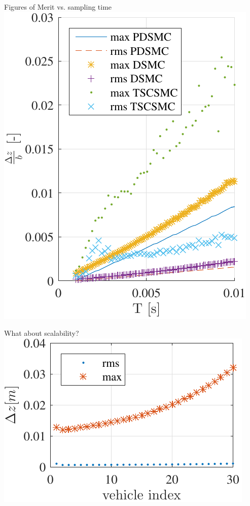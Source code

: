 \documentclass[12pt,svgnames,table,draft=false]{beamer}
\begin{document}
\begin{frame}{Figures of Merit vs. sampling time}
\centering
\includegraphics[height=0.8\paperheight]{error-z-vs-samplingtime.pdf}    
\end{frame}

\begin{frame}{What about scalability?}
\centering
\includegraphics[width=\columnwidth]{erroramplification-DSMC-100Hz-TIMESCALESEPARATION-turbulence=1-turbulenceonlyfirstUAS} 
\end{frame}
\end{document}
